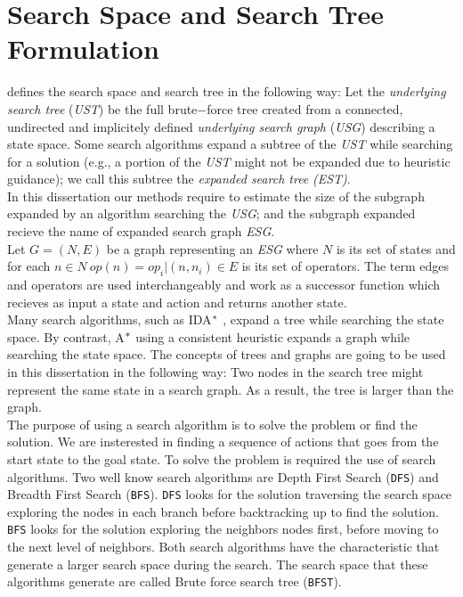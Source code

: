 \section{Search Space and Search Tree Formulation}
\cite{lelis2013predicting} defines the search space and search tree in the following way: Let the \textit{underlying search tree} (\textit{UST}) be the full brute$-$force tree created from a connected, undirected and implicitely defined \textit{underlying search graph} (\textit{USG}) describing a state space. Some search algorithms expand a subtree of the \textit{UST} while searching for a solution (\textsf{e.g.,} a portion of the \textit{UST} might not be expanded due to heuristic guidance); we call this subtree the \textit{expanded search tree} \textit{(EST)}.\\

In this dissertation our methods require to estimate the size of the subgraph expanded by an algorithm searching the \textit{USG}; and the subgraph expanded recieve the name of expanded search graph \textit{ESG}.\\

Let $G = (N,E)$ be a graph representing an \textit{ESG} where $N$ is its set of states and for each $n \in N\  op(n) = {op_{i}|(n, n_i) \in E}$ is its set of operators. The term edges and operators are used interchangeably and work as a successor function which recieves as input a state and action and returns another state.\\

Many search algorithms, such as IDA$\sp{*}$ \cite{Korf85ida}, expand a tree while searching the state space. By contrast, A$\sp{*}$ using a consistent heuristic expands a graph while searching the state space. The concepts of trees and graphs are going to be used in this dissertation in the following way: Two nodes in the search tree might represent the same state in a search graph. As a result, the tree is larger than the graph.\\

The purpose of using a search algorithm is to solve the problem or find the solution. We are insterested in finding a sequence of actions that goes from the start state to the goal state. To solve the problem is required the use of search algorithms. Two well know search algorithms are Depth First Search (\texttt{DFS}) and Breadth First Search (\texttt{BFS}). \texttt{DFS} looks for the solution traversing the search space exploring the nodes in each branch before backtracking up to find the solution. \texttt{BFS} looks for the solution exploring the neighbors nodes first, before moving to the next level of neighbors. Both search algorithms have the characteristic that generate a larger search space during the search. The search space that these algorithms generate are called Brute force search tree (\texttt{BFST}).\\

